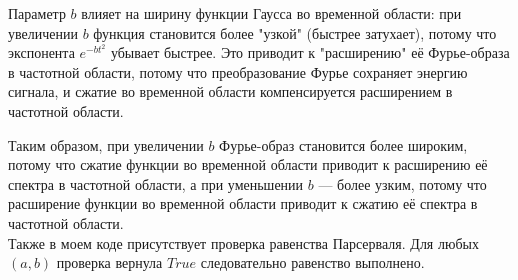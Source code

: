 \documentclass[a4paper,12pt]{article}
\begin{document}
Параметр \( b \) влияет на ширину функции Гаусса во временной области: при увеличении \( b \) функция становится более "узкой" (быстрее затухает), потому что экспонента \( e^{-b t^2} \) убывает быстрее. Это приводит к "расширению" её Фурье-образа в частотной области, потому что преобразование Фурье сохраняет энергию сигнала, и сжатие во временной области компенсируется расширением в частотной области.

Таким образом, при увеличении \( b \) Фурье-образ становится более широким, потому что сжатие функции во временной области приводит к расширению её спектра в частотной области, а при уменьшении \( b \) — более узким, потому что расширение функции во временной области приводит к сжатию её спектра в частотной области.\\


Также в моем коде присутствует проверка равенства Парсерваля. Для любых \( (a, b) \) проверка вернула \( True\) следовательно равенство выполнено.
\end{document}
